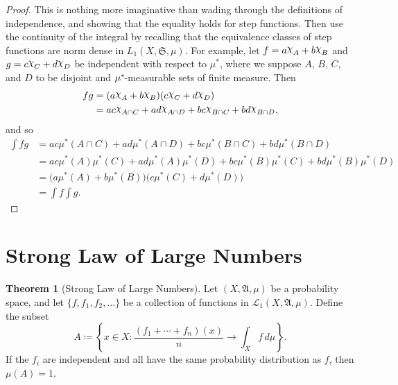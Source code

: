 \documentclass[
twoside=true,
paper=letter,
fontsize=9pt,
pagesize=auto,
leqno,
openany,
headsepline,
overfullrule,
]{scrbook}
\theoremstyle{plain}
\theoremstyle{plain}
\theoremstyle{definition}
\theoremstyle{bfnoteitalic}
\newtheorem{thmboldnote}[thm]{Theorem}
\theoremstyle{bfnoteroman}
\newcommand{\sigalg}[1]{\mathfrak{#1}}
\newcommand{\cali}[1]{\mathscr{#1}}
\newcommand{\definedby}{\coloneqq}
\newcommand{\charfunction}[1]{{\raisebox{2pt}{$\chi$}}_{#1}}
\newcommand{\meets}{\cap}
\newcommand{\semiring}{\sigalg{S}}
\newcommand{\sigmaalgebra}{\sigalg{A}}
\newcommand{\kernast}{\ast\kern-1pt}
\newcommand{\function}{f}
\newcommand{\functionii}{g}
\newcommand{\measurespace}{X}
\newcommand{\mspaceelt}{x}
\newcommand{\measure}{\mu}
\newcommand{\seti}{A}
\newcommand{\setii}{B}
\newcommand{\setiii}{C}
\newcommand{\setiv}{D}
\begin{document}
\begin{proof}
This is nothing more imaginative than wading through the definitions of independence,
and showing that the equality holds for step functions. Then use the continuity of the integral by recalling that the equivalence classes of step functions are norm dense in 
$L_1(\measurespace, \semiring,\measure)$.
For example, let 
$\function = a\charfunction{\seti} + b\charfunction{\setii}$ and 
$\functionii = c\charfunction{\setiii} + d\charfunction{\setiv}$ be independent with respect to $\measure^*$,
where we suppose $\seti$, $\setii$, $\setiii$, and $\setiv$ to be disjoint and $\measure^\kernast$-measurable sets of finite measure. Then
\begin{align*}
\function\functionii 
& =
(a\charfunction{\seti} + b\charfunction{\setii})
(c\charfunction{\setiii} + d\charfunction{\setiv}) \\
& = ac\charfunction{\seti\meets\setiii}
+ ad\charfunction{\seti\meets\setiv}
+ bc\charfunction{\setii\meets\setiii}
+ bd\charfunction{\setii\meets\setiv},
\end{align*}
and so 
\begin{align*}
\int fg 
& = ac\measure^*(\seti\meets\setiii)
+ ad\measure^*(\seti\meets\setiv)
+ bc\measure^*(\setii\meets\setiii)
+ bd\measure^*(\setii\meets\setiv)\\
& = ac\measure^*(\seti)\measure^*(\setiii)
+ ad\measure^*(\seti)\measure^*(\setiv)
+ bc\measure^*(\setii)\measure^*(\setiii)
+ bd\measure^*(\setii)\measure^*(\setiv)\\
& = \bigl(a\measure^*(\seti) + b\measure^*(\setii)\bigr)
\bigl(c\measure^*(\setiii) + d\measure^*(\setiv)\bigr) \\
& = \int \function \int \functionii.
\end{align*}
\end{proof}




\section{Strong Law of Large Numbers}
\begin{thmboldnote}[Strong Law of Large Numbers]\label{large_numbers}
Let $(\measurespace,\sigmaalgebra,\measure)$ be a probability space, and let
$\{\function, \function_1,\function_2,\ldots\}$ be a collection of functions in  $\cali{L}_1(\measurespace,\sigmaalgebra,\measure)$. Define the subset
\[
\seti \definedby
\left\{ \mspaceelt\in\measurespace : 
\frac{(\function_1 + \cdots + \function_n)(\mspaceelt)}{n}
\to 
\int_\measurespace \function \, d\measure
\right\}.
\]
If the $\function_i$ are independent and all have the same probability distribution as $\function$, then 
$\measure(\seti) = 1$.
\end{thmboldnote}
\end{document}
